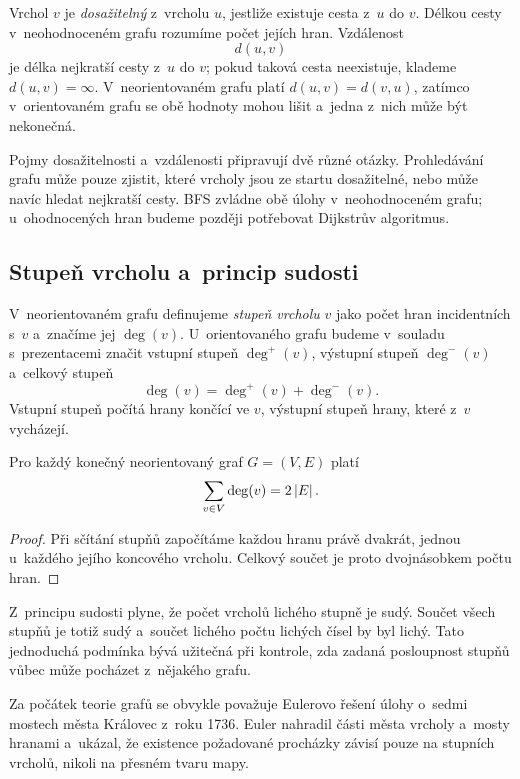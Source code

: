 Vrchol \(v\) je \emph{dosažitelný} z~vrcholu \(u\), jestliže existuje cesta z~\(u\) do \(v\). Délkou cesty v~neohodnoceném grafu rozumíme počet jejích hran. Vzdálenost
\[
    d(u,v)
\]
je délka nejkratší cesty z~\(u\) do \(v\); pokud taková cesta neexistuje, klademe \(d(u,v)=\infty\). V~neorientovaném grafu platí \(d(u,v)=d(v,u)\), zatímco v~orientovaném grafu se obě hodnoty mohou lišit a~jedna z~nich může být nekonečná.

Pojmy dosažitelnosti a~vzdálenosti připravují dvě různé otázky. Prohledávání grafu může pouze zjistit, které vrcholy jsou ze startu dosažitelné, nebo může navíc hledat nejkratší cesty. BFS zvládne obě úlohy v~neohodnoceném grafu; u~ohodnocených hran budeme později potřebovat Dijkstrův algoritmus.

\subsection{Stupeň vrcholu a~princip sudosti}

V~neorientovaném grafu definujeme \emph{stupeň vrcholu} \(v\) jako počet hran incidentních s~\(v\) a~značíme jej \(\deg(v)\). U~orientovaného grafu budeme v~souladu s~prezentacemi značit vstupní stupeň \(\deg^+(v)\), výstupní stupeň \(\deg^-(v)\) a~celkový stupeň
\[
    \deg(v)=\deg^+(v)+\deg^-(v).
\]
Vstupní stupeň počítá hrany končící ve \(v\), výstupní stupeň hrany, které z~\(v\) vycházejí.

\begin{proposition}\label{prop:princip-sudosti}
    Pro každý konečný neorientovaný graf \(G=(V,E)\) platí
    \[
        \sum_{v\in V}\deg(v)=2\left| E \right|.
    \]
\end{proposition}

\begin{proof}
    Při sčítání stupňů započítáme každou hranu právě dvakrát, jednou u~každého jejího koncového vrcholu. Celkový součet je proto dvojnásobkem počtu hran.
\end{proof}

Z~principu sudosti plyne, že počet vrcholů lichého stupně je sudý. Součet všech stupňů je totiž sudý a~součet lichého počtu lichých čísel by byl lichý. Tato jednoduchá podmínka bývá užitečná při kontrole, zda zadaná posloupnost stupňů vůbec může pocházet z~nějakého grafu.

\begin{remark}
    Za počátek teorie grafů se obvykle považuje Eulerovo řešení úlohy o~sedmi mostech města Královec z~roku 1736. Euler nahradil části města vrcholy a~mosty hranami a~ukázal, že existence požadované procházky závisí pouze na stupních vrcholů, nikoli na přesném tvaru mapy.
\end{remark}

